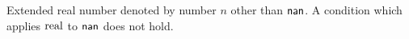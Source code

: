Extended real number denoted by number $n$ other than $\mathsf{nan}$. A condition which applies $\mathrm{real}$ to $\mathsf{nan}$ does not hold.

